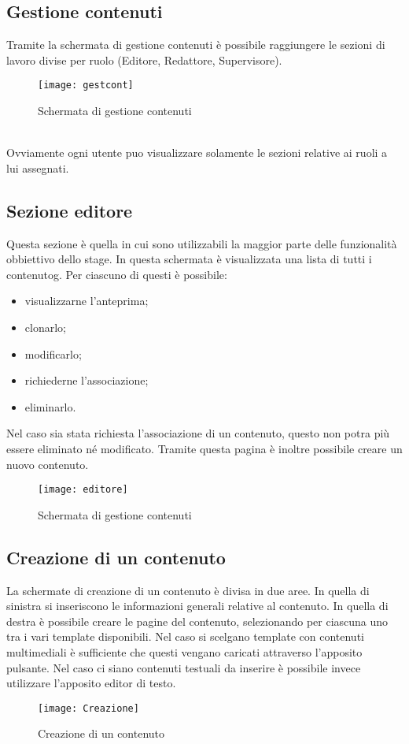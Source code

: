 \subsection{Gestione contenuti}
Tramite la schermata di gestione contenuti è possibile raggiungere le sezioni di lavoro divise per ruolo (Editore, Redattore, Supervisore).
\begin{figure}[h]
    \begin{center}
    \texttt{[image: gestcont]}
    \caption{Schermata di gestione contenuti}
    \label{fig:figure22}
    \end{center}
\end{figure}
\\Ovviamente ogni utente puo visualizzare solamente le sezioni relative ai ruoli a lui assegnati.

\subsection{Sezione editore}
Questa sezione è quella in cui sono utilizzabili la maggior parte delle funzionalità obbiettivo dello stage. In questa schermata è visualizzata una lista di tutti i \gls{contenutog}. Per ciascuno di questi è possibile:
\begin{itemize}
    \item visualizzarne l'anteprima;
    \item clonarlo;
    \item modificarlo;
    \item richiederne l'associazione;
    \item eliminarlo.
\end{itemize}
Nel caso sia stata richiesta l'associazione di un contenuto, questo non potra più essere eliminato né modificato.
Tramite questa pagina è inoltre possibile creare un nuovo contenuto.
\begin{figure}[h]
    \begin{center}
    \texttt{[image: editore]}
    \caption{Schermata di gestione contenuti}
    \label{fig:figure23}
    \end{center}
\end{figure}

\subsection{Creazione di un contenuto}
La schermate di creazione di un contenuto è divisa in due aree. In quella di sinistra si inseriscono le informazioni generali relative al contenuto. In quella di destra è possibile creare le pagine del contenuto, selezionando per ciascuna uno tra i vari template disponibili.
Nel caso si scelgano template con contenuti multimediali è sufficiente che questi vengano caricati attraverso l'apposito pulsante. Nel caso ci siano contenuti testuali da inserire è possibile invece utilizzare l'apposito editor di testo.
\begin{figure}[h]
    \begin{center}
    \texttt{[image: Creazione]}
    \caption{Creazione di un contenuto}
    \label{fig:figure24}
    \end{center}
\end{figure}

